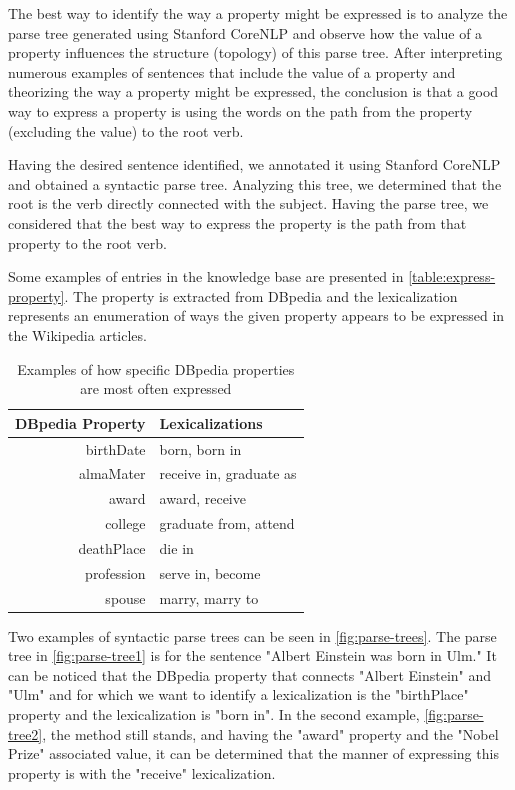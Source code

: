 The best way to identify the way a property might be expressed is to analyze the parse tree generated using Stanford CoreNLP and observe how the value of a property influences the structure (topology) of this parse tree. After interpreting numerous examples of sentences that include the value of a property and theorizing the way a property might be expressed, the conclusion is that a good way to express a property is using the words on the path from the property (excluding the value) to the root verb.

Having the desired sentence identified, we annotated it using Stanford CoreNLP and obtained a syntactic parse tree.  Analyzing this tree, we determined that the root is the verb directly connected with the subject. Having the parse tree, we considered that the best way to express the property is the path from that property to the root verb.

Some examples of entries in the knowledge base are presented in \autoref{table:express-property}. The property is extracted from DBpedia and the lexicalization represents an enumeration of ways the given property appears to be expressed in the Wikipedia articles.

\begin{table}[htb]
  \centering
  \begin{tabular}{r|l}
    \textbf{DBpedia Property} & \textbf{Lexicalizations} \\
    \hline
    birthDate & born, born in \\
    almaMater & receive in, graduate as \\
    award & award, receive \\
    college & graduate from, attend \\
    deathPlace & die in \\ 
    profession & serve in, become \\
    spouse & marry, marry to \\
  \end{tabular}
  \caption{Examples of how specific DBpedia properties are most often expressed}
  \label{table:express-property}
\end{table}

Two examples of syntactic parse trees can be seen in \autoref{fig:parse-trees}. The parse tree in \autoref{fig:parse-tree1} is for the sentence "Albert Einstein was born in Ulm." It can be noticed that the DBpedia property that connects "Albert Einstein" and "Ulm" and for which we want to identify a
lexicalization is the "birthPlace" property and the lexicalization is "born in". In the second example, \autoref{fig:parse-tree2}, the method still stands, and having the "award" property and the "Nobel Prize" associated value, it can be determined that the manner of expressing this property is with the "receive" lexicalization.


